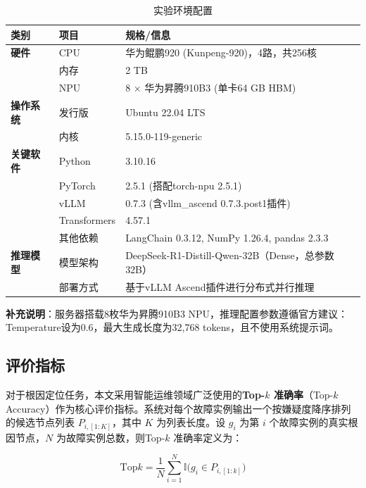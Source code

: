 \begin{table}[htbp]
    \centering
    \caption{实验环境配置}
    \label{tab:experimental-setup}
    \small
    \begin{tabularx}{\textwidth}{llX}
        \toprule
        \textbf{类别} & \textbf{项目} & \textbf{规格/信息} \\
        \midrule
        \textbf{硬件} & CPU & 华为鲲鹏920 (Kunpeng-920)，4路，共256核\\
        & 内存 & 2 TB \\
        & NPU & 8 $\times$ 华为昇腾910B3 (单卡64 GB HBM) \\
        \midrule
        \textbf{操作系统} & 发行版 & Ubuntu 22.04 LTS \\
        & 内核 & 5.15.0-119-generic \\
        \midrule
        \textbf{关键软件} & Python & 3.10.16 \\
        & PyTorch & 2.5.1 (搭配torch-npu 2.5.1) \\
        & vLLM & 0.7.3 (含vllm\_ascend 0.7.3.post1插件) \\
        & Transformers & 4.57.1 \\
        & 其他依赖 & LangChain 0.3.12, NumPy 1.26.4, pandas 2.3.3 \\
        \midrule
        \textbf{推理模型} & 模型架构 & DeepSeek-R1-Distill-Qwen-32B（Dense，总参数32B）\\
        & 部署方式 & 基于vLLM Ascend插件进行分布式并行推理\\
        \bottomrule
    \end{tabularx}
\end{table}

\noindent \textbf{补充说明}：服务器搭载8枚华为昇腾910B3 NPU，推理配置参数遵循官方建议：Temperature设为0.6，最大生成长度为32,768 tokens，且不使用系统提示词。
\subsection{评价指标}

对于根因定位任务，本文采用智能运维领域广泛使用的\textbf{Top-$k$ 准确率}（Top-$k$ Accuracy）作为核心评价指标。系统对每个故障实例输出一个按嫌疑度降序排列的候选节点列表 $P_{i,[1:K]}$，其中 $K$ 为列表长度。设 $g_i$ 为第 $i$ 个故障实例的真实根因节点，$N$ 为故障实例总数，则Top-$k$ 准确率定义为：

\begin{equation}
\text{Top}k = \frac{1}{N} \sum_{i=1}^{N} \mathbb{I}\bigl(g_i \in P_{i,[1:k]}\bigr)
\end{equation}

